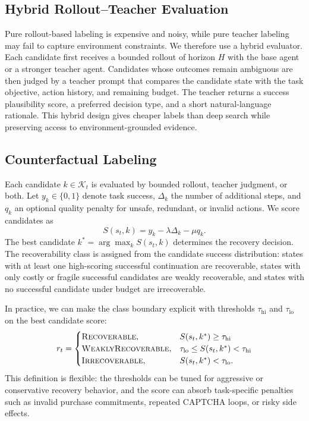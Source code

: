 \documentclass[11pt]{article}
\begin{document}
\subsection{Hybrid Rollout--Teacher Evaluation}
Pure rollout-based labeling is expensive and noisy, while pure teacher labeling may fail to capture environment constraints. We therefore use a hybrid evaluator. Each candidate first receives a bounded rollout of horizon $H$ with the base agent or a stronger teacher agent. Candidates whose outcomes remain ambiguous are then judged by a teacher prompt that compares the candidate state with the task objective, action history, and remaining budget. The teacher returns a success plausibility score, a preferred decision type, and a short natural-language rationale. This hybrid design gives cheaper labels than deep search while preserving access to environment-grounded evidence.

\subsection{Counterfactual Labeling}
Each candidate $k \in \mathcal{K}_t$ is evaluated by bounded rollout, teacher judgment, or both. Let $y_k \in \{0,1\}$ denote task success, $\Delta_k$ the number of additional steps, and $q_k$ an optional quality penalty for unsafe, redundant, or invalid actions. We score candidates as
\begin{equation}
S(s_t,k) = y_k - \lambda \Delta_k - \mu q_k.
\end{equation}
The best candidate $k^*=\arg\max_k S(s_t,k)$ determines the recovery decision. The recoverability class is assigned from the candidate success distribution: states with at least one high-scoring successful continuation are recoverable, states with only costly or fragile successful candidates are weakly recoverable, and states with no successful candidate under budget are irrecoverable.

In practice, we can make the class boundary explicit with thresholds $\tau_{\mathrm{hi}}$ and $\tau_{\mathrm{lo}}$ on the best candidate score:
\begin{equation}
r_t =
\begin{cases}
\textsc{Recoverable}, & S(s_t,k^*) \ge \tau_{\mathrm{hi}} \\
\textsc{WeaklyRecoverable}, & \tau_{\mathrm{lo}} \le S(s_t,k^*) < \tau_{\mathrm{hi}} \\
\textsc{Irrecoverable}, & S(s_t,k^*) < \tau_{\mathrm{lo}}.
\end{cases}
\end{equation}
This definition is flexible: the thresholds can be tuned for aggressive or conservative recovery behavior, and the score can absorb task-specific penalties such as invalid purchase commitments, repeated CAPTCHA loops, or risky side effects.
\end{document}
